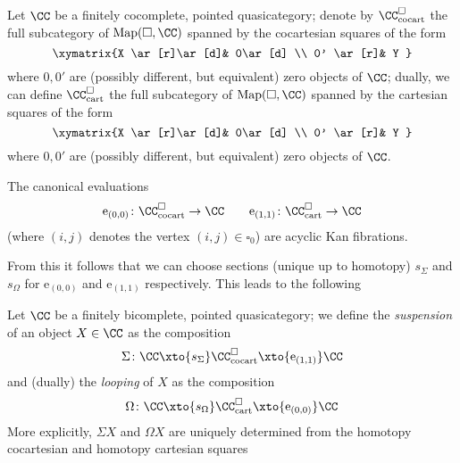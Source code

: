 \begin{definition}
Let $\CC$ be a finitely cocomplete, pointed quasicategory; denote by $\CC^\square_\text{cocart}$ the full subcategory of $\text{Map}(\square,\CC)$ spanned by the cocartesian squares of the form
\[
\xymatrix{%
X \ar[r]\ar[d]& 0\ar[d] \\
0' \ar[r]& Y
}
\]
where $0,0'$ are (possibly different, but equivalent) zero objects of $\CC$; dually, we can define $\CC^\square_\text{cart}$ the full subcategory of $\text{Map}(\square,\CC)$ spanned by the cartesian squares of the form
\[
\xymatrix{%
X \ar[r]\ar[d]& 0\ar[d] \\
0' \ar[r]& Y
}
\]
where $0,0'$ are (possibly different, but equivalent) zero objects of $\CC$. 
\end{definition}
\begin{proposition}
The canonical evaluations
\[
\text{e}_{(0,0)}\colon \CC^\square_\text{cocart}\to \CC\qquad 
\text{e}_{(1,1)}\colon \CC^\square_\text{cart}\to \CC
\]
(where $(i,j)$ denotes the vertex $(i,j)\in \square_0$) are acyclic Kan fibrations.
\end{proposition}
From this it follows that we can choose sections (unique up to homotopy) $s_\Sigma$ and $s_\Omega$ for $\text{e}_{(0,0)}$ and $\text{e}_{(1,1)}$ respectively. This leads to the following
\begin{definition}
Let $\CC$ be a finitely bicomplete, pointed quasicategory; we define the \emph{suspension} of an object $X\in\CC$ as the composition
\[
\Sigma\colon \CC\xto{s_\Sigma}\CC^\square_\text{cocart}\xto{\text{e}_{(1,1)}} \CC
\]
and (dually) the \emph{looping} of $X$ as the composition
\[
\Omega\colon \CC\xto{s_\Omega}\CC^\square_\text{cart}\xto{\text{e}_{(0,0)}}\CC
\]
More explicitly, $\Sigma X$ and $\Omega X$ are uniquely determined from the homotopy cocartesian and homotopy cartesian squares
\end{definition}
\hrulefill

